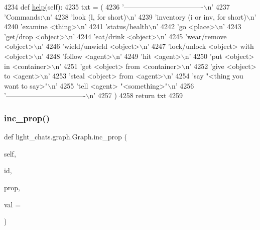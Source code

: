 \begin{DoxyCode}
4234     \textcolor{keyword}{def }\hyperlink{namespaceparlai_1_1agents_1_1tfidf__retriever_1_1build__tfidf_a0e12682c80997535ca4f7f293b8c6d10}{help}(self):
4235         txt = (
4236             \textcolor{stringliteral}{'----------------------------------\(\backslash\)n'}
4237             \textcolor{stringliteral}{'Commands:\(\backslash\)n'}
4238             \textcolor{stringliteral}{'look (l, for short)\(\backslash\)n'}
4239             \textcolor{stringliteral}{'inventory (i or inv, for short)\(\backslash\)n'}
4240             \textcolor{stringliteral}{'examine <thing>\(\backslash\)n'}
4241             \textcolor{stringliteral}{'status/health\(\backslash\)n'}
4242             \textcolor{stringliteral}{'go <place>\(\backslash\)n'}
4243             \textcolor{stringliteral}{'get/drop <object>\(\backslash\)n'}
4244             \textcolor{stringliteral}{'eat/drink <object>\(\backslash\)n'}
4245             \textcolor{stringliteral}{'wear/remove <object>\(\backslash\)n'}
4246             \textcolor{stringliteral}{'wield/unwield <object>\(\backslash\)n'}
4247             \textcolor{stringliteral}{'lock/unlock <object> with <object>\(\backslash\)n'}
4248             \textcolor{stringliteral}{'follow <agent>\(\backslash\)n'}
4249             \textcolor{stringliteral}{'hit <agent>\(\backslash\)n'}
4250             \textcolor{stringliteral}{'put <object> in <container>\(\backslash\)n'}
4251             \textcolor{stringliteral}{'get <object> from <container>\(\backslash\)n'}
4252             \textcolor{stringliteral}{'give <object> to <agent>\(\backslash\)n'}
4253             \textcolor{stringliteral}{'steal <object> from <agent>\(\backslash\)n'}
4254             \textcolor{stringliteral}{'say "<thing you want to say>"\(\backslash\)n'}
4255             \textcolor{stringliteral}{'tell <agent> "<something>"\(\backslash\)n'}
4256             \textcolor{stringliteral}{'----------------------------------\(\backslash\)n'}
4257         )
4258         \textcolor{keywordflow}{return} txt
4259 
\end{DoxyCode}
\mbox{\label{classlight__chats_1_1graph_1_1Graph_a871d833484089923fa5d1d4bb357ec7a}} 
\subsubsection{\texorpdfstring{inc\+\_\+prop()}{inc\_prop()}}
{\footnotesize\ttfamily def light\+\_\+chats.\+graph.\+Graph.\+inc\+\_\+prop (\begin{DoxyParamCaption}\item[{}]{self,  }\item[{}]{id,  }\item[{}]{prop,  }\item[{}]{val = {} }\end{DoxyParamCaption})}

